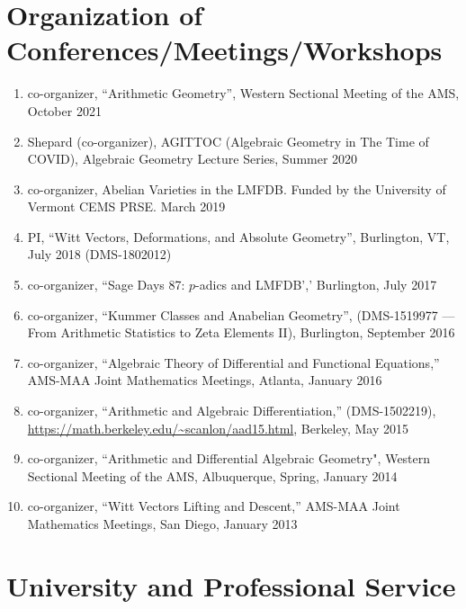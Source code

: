 \documentclass[a4paper,10pt]{article}
\begin{document}
\section*{Organization of Conferences/Meetings/Workshops}

\begin{enumerate} %
	\item co-organizer, ``Arithmetic Geometry'', Western Sectional Meeting of the AMS, October 2021
	\item Shepard (co-organizer), AGITTOC (Algebraic Geometry in The Time of COVID), Algebraic Geometry Lecture Series, Summer 2020  
	\item co-organizer, Abelian Varieties in the LMFDB. Funded by the University of Vermont CEMS PRSE. March 2019
	\item PI, ``Witt Vectors, Deformations, and Absolute Geometry'', Burlington, VT, July 2018 (DMS-1802012)
	\item co-organizer, ``Sage Days 87: $p$-adics and LMFDB',' Burlington, July 2017
	\item co-organizer, ``Kummer Classes and Anabelian Geometry'', (DMS-1519977 --- From Arithmetic Statistics to Zeta Elements II), Burlington, September 2016
	\item co-organizer, ``Algebraic Theory of Differential and Functional Equations,''  AMS-MAA Joint Mathematics Meetings, Atlanta, January 2016
	\item co-organizer, ``Arithmetic and Algebraic Differentiation,'' (DMS-1502219), \url{https://math.berkeley.edu/~scanlon/aad15.html}, Berkeley, May 2015 
	\item co-organizer, ``Arithmetic and Differential Algebraic Geometry", Western Sectional Meeting of the AMS, Albuquerque, Spring, January 2014
	\item co-organizer, ``Witt Vectors Lifting and Descent,'' AMS-MAA Joint Mathematics Meetings, San Diego, January 2013
\end{enumerate}

\section*{University and Professional Service}
\end{document}
